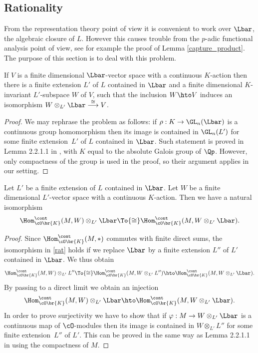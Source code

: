 \subsection{Rationality} From the representation theory point of view it is convenient to work over $\Lbar$, the algebraic closure of $L$. However this causes trouble from the $p$\nobreakdash-adic functional analysis point of view, see for example the proof
of Lemma \ref{capture_product}. The purpose of this section is to deal with this problem.

\begin{lem}\label{finite_structure} If $V$ is a finite dimensional $\Lbar$-vector space with a continuous $K$\nobreakdash-action then there
is a finite extension $L'$ of $L$ contained in $\Lbar$ and a finite dimensional $K$\nobreakdash-in\-variant $L'$-subspace $W$ of $V$,
such that the inclusion $W\hto V$ induces an isomorphism $W\otimes_{L'} \Lbar\overset{\cong}{\longrightarrow} V$.
\end{lem}

\begin{proof} We may rephrase the problem as follows: if $\rho: K \to \GL_n(\Lbar)$ is a continuous group
homomorphism then its image is contained in $\GL_n(L')$ for some finite extension~$L'$ of $L$ contained in $\Lbar$.
Such statement is proved in Lemma 2.2.1.1 in \cite{bm1}, with $K$ equal to the absolute Galois group of $\Qp$. However,
only compactness of the group is used in the proof, so their argument applies in our setting.
\end{proof}

\begin{lem}\label{homs_the_same} Let $L'$ be a finite extension of $L$ contained in $\Lbar$. Let $W$ be a finite dimensional $L'$-vector
space with a continuous $K$-action. Then we have a natural isomorphism
\begin{equation}\label{rat}
\Hom_{\cO\br{K}}^{\cont}(M, W)\otimes_{L'} \Lbar \To{\cong}\Hom_{\cO\br{K}}^{\cont}(M, W\otimes_{L'}\Lbar).
\end{equation}
\end{lem}

\begin{proof} Since $\Hom_{\cO\br{K}}^{\cont}(M, \ast)$ commutes with finite direct sums, the isomorphism in \eqref{rat} holds if we replace $\Lbar$ by a finite extension $L''$ of $L'$ contained in $\Lbar$. We thus obtain
\[
\Hom_{\cO\br{K}}^{\cont}(M, W)\otimes_{L'} L'' \To{\cong}\Hom_{\cO\br{K}}^{\cont}(M, W\otimes_{L'} L'')
\hto \Hom_{\cO\br{K}}^{\cont}(M, W\otimes_{L'} \Lbar).
\]
By passing to a direct limit we obtain an injection
\[
\Hom_{\cO\br{K}}^{\cont}(M, W)\otimes_{L'} \Lbar \hto \Hom_{\cO\br{K}}^{\cont}(M, W\otimes_{L'} \Lbar).
\]
In order to prove surjectivity we have to show that if $\varphi: M\to W\otimes_{L'}\Lbar$ is a continuous map of
$\cO$-modules then its image is contained in $W\otimes_{L'}L''$ for some finite extension~$L''$ of $L'$. This can be proved in the same way as Lemma 2.2.1.1 in \cite{bm1}
using the compactness of $M$.
\end{proof}


